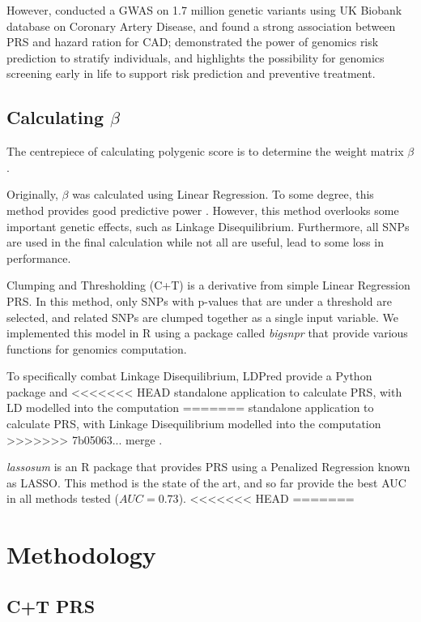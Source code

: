 \documentclass{article}
\begin{document}
However, \cite{Inouye1883} conducted a GWAS on 1.7 million genetic
variants using UK Biobank database on Coronary Artery Disease, and found
a strong association between PRS and hazard ration for CAD; demonstrated
the power of genomics risk prediction to stratify individuals, and highlights the
possibility for genomics screening early in life to support risk prediction and
preventive treatment.

\subsection{Calculating $\beta$}
The centrepiece of calculating polygenic score is to determine the weight matrix $\beta$.

Originally, $\beta$ was calculated using Linear Regression. To some degree, this method
provides good predictive power \cite{Dudbridge2013}. However, this method overlooks some 
important genetic effects, such as Linkage Disequilibrium. Furthermore, all SNPs are 
used in the final calculation while not all are useful, lead to some loss in performance.

Clumping and Thresholding (C+T) is a derivative from simple Linear Regression PRS. 
In this method, only SNPs with p-values that are under a threshold are selected, and 
related SNPs are clumped together as a single input variable. 
We implemented this model in R using a package called \textit{bigsnpr} \cite{bigsnpr} 
that provide various functions for genomics computation.

To specifically combat Linkage Disequilibrium, LDPred provide a Python package and 
<<<<<<< HEAD
standalone application to calculate PRS, with LD modelled into the computation 
=======
standalone application to calculate PRS, with Linkage Disequilibrium modelled into the computation 
>>>>>>> 7b05063... merge
\cite{LDpred}.

\textit{lassosum} \cite{doi:10.1002/gepi.22050} is an R package that provides PRS using a 
Penalized Regression known as LASSO. 
This method is the state of the art, and so far provide the best AUC in all methods 
tested ($AUC = 0.73$).
<<<<<<< HEAD
=======

\section{Methodology}

\subsection{C+T PRS}
\end{document}
